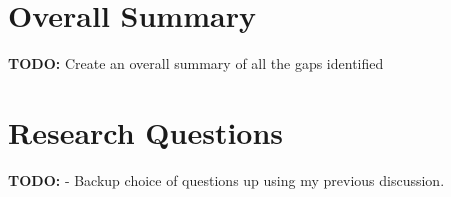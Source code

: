 \section{Overall Summary}
\textbf{TODO: } Create an overall summary of all the gaps identified

\section{Research Questions}
\textbf{TODO: } - Backup choice of questions up using my previous discussion.